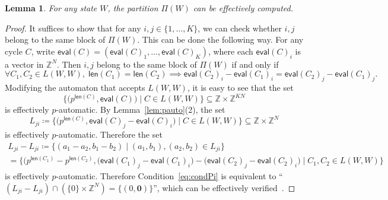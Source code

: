 \documentclass[letterpaper, 11pt, thm-restate]{article}
\numberwithin{equation}{section}
\newcommand{\Z}{\mathbb{Z}}
\newcommand{\bzer}{\boldsymbol{0}}
\newcommand{\len}{\mathsf{len}}
\newcommand{\eval}{\mathsf{eval}}
\newtheorem{lem}[thrm]{Lemma}
\theoremstyle{definition}
\theoremstyle{definition}
\theoremstyle{definition}
\begin{document}
\begin{lem}
For any state $W$, the partition $\Pi(W)$ can be effectively computed.
\end{lem}
\begin{proof}
    It suffices to show that for any $i, j \in \{1, \ldots, K\}$, we can check whether $i, j$ belong to the same block of $\Pi(W)$.
    This can be done the following way.
    For any cycle $C$, write $\eval(C) = \left(\eval(C)_1, \ldots, \eval(C)_K\right)$, where each $\eval(C)_i$ is a vector in $\Z^N$.
    Then $i, j$ belong to the same block of $\Pi(W)$ if and only if
    \begin{equation}\label{eq:condPi}
    \forall C_1, C_2 \in L(W, W), \; \len(C_1) = \len(C_2) \implies \eval(C_2)_i - \eval(C_1)_i = \eval(C_2)_j - \eval(C_1)_j.
    \end{equation}
    Modifying the automaton that accepts $L(W, W)$, it is easy to see that the set
    \begin{equation*}
    \Big\{\big(p^{\len(C)}, \eval(C) \big) \;\Big|\; C \in L(W, W) \Big\} \subseteq \Z \times \Z^{KN}
    \end{equation*}
    is effectively $p$-automatic.
    By Lemma~\ref{lem:pauto}(2), the set
    \begin{equation*}
    L_{ji} \coloneqq \Big\{\big(p^{\len(C)}, \eval(C)_j - \eval(C)_i \big) \;\Big|\; C \in L(W, W) \Big\} \subseteq \Z \times \Z^N
    \end{equation*}
    is effectively $p$-automatic.
    Therefore the set
    \begin{multline*}
    L_{ji} - L_{ji} \coloneqq \big\{(a_1-a_2,b_1-b_2) \;\big|\; (a_1,b_1), (a_2, b_2) \in L_{ji} \big\} \\
    = \bigg\{\big(p^{\len(C_1)} - p^{\len(C_2)}, \big(\eval(C_1)_j - \eval(C_1)_i\big) - \big(\eval(C_2)_j - \eval(C_2)_i\big) \;\bigg|\; C_1,C_2 \in L(W, W) \bigg\}
    \end{multline*}
    is effectively $p$-automatic.
    Therefore Condition~\eqref{eq:condPi} is equivalent to ``$(L_{ji} - L_{ji}) \cap (\{0\} \times \Z^N) = \{(0, \bzer)\}$'', which can be effectively verified~\cite{wolper2000construction}.
\end{proof}
\end{document}
